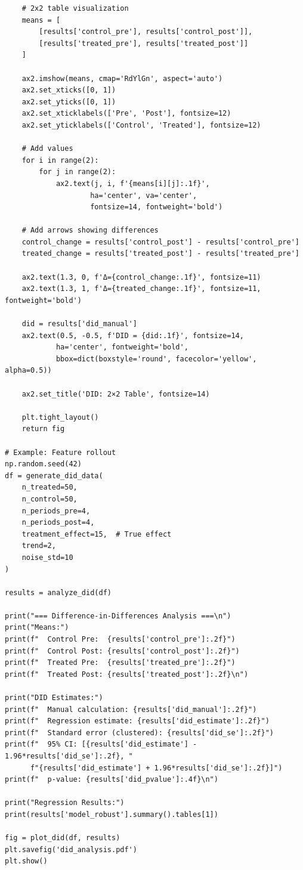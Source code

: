 \begin{lstlisting}
    # 2x2 table visualization
    means = [
        [results['control_pre'], results['control_post']],
        [results['treated_pre'], results['treated_post']]
    ]

    ax2.imshow(means, cmap='RdYlGn', aspect='auto')
    ax2.set_xticks([0, 1])
    ax2.set_yticks([0, 1])
    ax2.set_xticklabels(['Pre', 'Post'], fontsize=12)
    ax2.set_yticklabels(['Control', 'Treated'], fontsize=12)

    # Add values
    for i in range(2):
        for j in range(2):
            ax2.text(j, i, f'{means[i][j]:.1f}',
                    ha='center', va='center',
                    fontsize=14, fontweight='bold')

    # Add arrows showing differences
    control_change = results['control_post'] - results['control_pre']
    treated_change = results['treated_post'] - results['treated_pre']

    ax2.text(1.3, 0, f'Δ={control_change:.1f}', fontsize=11)
    ax2.text(1.3, 1, f'Δ={treated_change:.1f}', fontsize=11, fontweight='bold')

    did = results['did_manual']
    ax2.text(0.5, -0.5, f'DID = {did:.1f}', fontsize=14,
            ha='center', fontweight='bold',
            bbox=dict(boxstyle='round', facecolor='yellow', alpha=0.5))

    ax2.set_title('DID: 2×2 Table', fontsize=14)

    plt.tight_layout()
    return fig

# Example: Feature rollout
np.random.seed(42)
df = generate_did_data(
    n_treated=50,
    n_control=50,
    n_periods_pre=4,
    n_periods_post=4,
    treatment_effect=15,  # True effect
    trend=2,
    noise_std=10
)

results = analyze_did(df)

print("=== Difference-in-Differences Analysis ===\n")
print("Means:")
print(f"  Control Pre:  {results['control_pre']:.2f}")
print(f"  Control Post: {results['control_post']:.2f}")
print(f"  Treated Pre:  {results['treated_pre']:.2f}")
print(f"  Treated Post: {results['treated_post']:.2f}\n")

print("DID Estimates:")
print(f"  Manual calculation: {results['did_manual']:.2f}")
print(f"  Regression estimate: {results['did_estimate']:.2f}")
print(f"  Standard error (clustered): {results['did_se']:.2f}")
print(f"  95% CI: [{results['did_estimate'] - 1.96*results['did_se']:.2f}, "
      f"{results['did_estimate'] + 1.96*results['did_se']:.2f}]")
print(f"  p-value: {results['did_pvalue']:.4f}\n")

print("Regression Results:")
print(results['model_robust'].summary().tables[1])

fig = plot_did(df, results)
plt.savefig('did_analysis.pdf')
plt.show()
\end{lstlisting}

